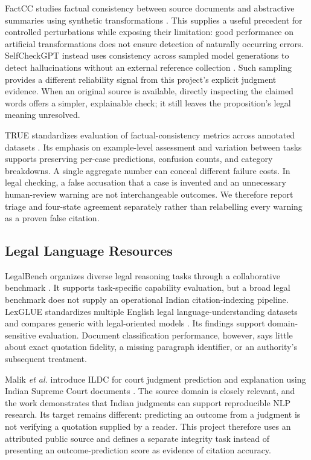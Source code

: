 FactCC studies factual consistency between source documents and abstractive summaries using synthetic transformations \cite{ref7}. This supplies a useful precedent for controlled perturbations while exposing their limitation: good performance on artificial transformations does not ensure detection of naturally occurring errors. SelfCheckGPT instead uses consistency across sampled model generations to detect hallucinations without an external reference collection \cite{ref8}. Such sampling provides a different reliability signal from this project's explicit judgment evidence. When an original source is available, directly inspecting the claimed words offers a simpler, explainable check; it still leaves the proposition's legal meaning unresolved.

TRUE standardizes evaluation of factual-consistency metrics across annotated datasets \cite{ref19}. Its emphasis on example-level assessment and variation between tasks supports preserving per-case predictions, confusion counts, and category breakdowns. A single aggregate number can conceal different failure costs. In legal checking, a false accusation that a case is invented and an unnecessary human-review warning are not interchangeable outcomes. We therefore report triage and four-state agreement separately rather than relabelling every warning as a proven false citation.

\subsection{Legal Language Resources}
LegalBench organizes diverse legal reasoning tasks through a collaborative benchmark \cite{ref9}. It supports task-specific capability evaluation, but a broad legal benchmark does not supply an operational Indian citation-indexing pipeline. LexGLUE standardizes multiple English legal language-understanding datasets and compares generic with legal-oriented models \cite{ref10}. Its findings support domain-sensitive evaluation. Document classification performance, however, says little about exact quotation fidelity, a missing paragraph identifier, or an authority's subsequent treatment.

Malik \emph{et al.} introduce ILDC for court judgment prediction and explanation using Indian Supreme Court documents \cite{ref11}. The source domain is closely relevant, and the work demonstrates that Indian judgments can support reproducible NLP research. Its target remains different: predicting an outcome from a judgment is not verifying a quotation supplied by a reader. This project therefore uses an attributed public source and defines a separate integrity task instead of presenting an outcome-prediction score as evidence of citation accuracy.

